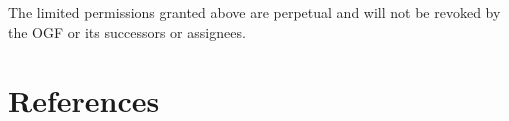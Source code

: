 \documentclass[10pt]{article}
\begin{document}
The limited permissions granted above are perpetual and will not be revoked by the OGF or its successors or assignees.

\section{References}
\renewcommand{\refname}{}
\vspace*{-3em}

\end{document}
